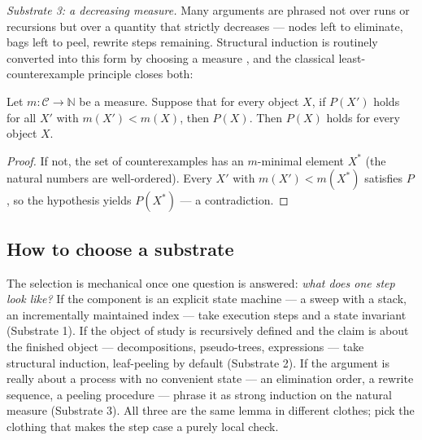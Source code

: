 \emph{Substrate 3: a decreasing measure.} Many arguments are phrased not over runs or
recursions but over a quantity that strictly decreases --- nodes left to eliminate, bags
left to peel, rewrite steps remaining. Structural induction is routinely converted into
this form by choosing a measure \citep{induction-bg5}, and the classical
least-counterexample principle closes both:

\begin{lemma}\label{lem:ind-strong}
Let $m\colon\mathcal{C}\to\mathbb{N}$ be a measure. Suppose that for every object $X$,
if $P(X')$ holds for all $X'$ with $m(X') < m(X)$, then $P(X)$. Then $P(X)$ holds for
every object $X$. \eop
\end{lemma}

\begin{proof}
If not, the set of counterexamples has an $m$-minimal element $X^{*}$ (the natural
numbers are well-ordered). Every $X'$ with $m(X') < m(X^{*})$ satisfies $P$, so the
hypothesis yields $P(X^{*})$ --- a contradiction.
\end{proof}


\subsection{How to choose a substrate}
\label{sec:ind-choose}

The selection is mechanical once one question is answered: \emph{what does one step
look like?} If the component is an explicit state machine --- a sweep with a stack, an
incrementally maintained index --- take execution steps and a state invariant
(Substrate 1). If the object of study is recursively defined and the claim is about the
finished object --- decompositions, pseudo-trees, expressions --- take structural
induction, leaf-peeling by default (Substrate 2). If the argument is really about a
process with no convenient state --- an elimination order, a rewrite sequence, a
peeling procedure --- phrase it as strong induction on the natural measure
(Substrate 3). All three are the same lemma in different clothes; pick the clothing
that makes the step case a purely local check.

